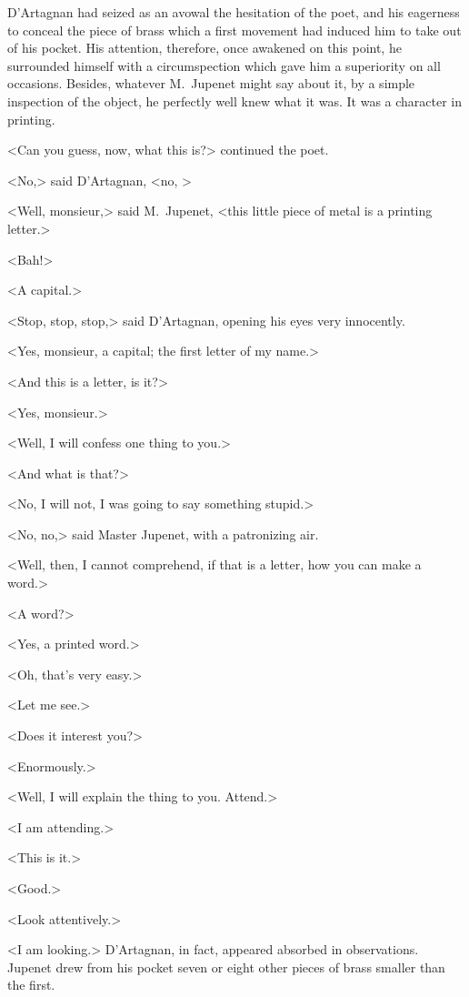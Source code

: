D'Artagnan had seized as an avowal the hesitation of the poet, and his eagerness to conceal the piece of brass which a first movement had induced him to take out of his pocket. His attention, therefore, once awakened on this point, he surrounded himself with a circumspection which gave him a superiority on all occasions. Besides, whatever M.~Jupenet might say about it, by a simple inspection of the object, he perfectly well knew what it was. It was a character in printing.

<Can you guess, now, what this is?> continued the poet.

<No,> said D'Artagnan, <no, >

<Well, monsieur,> said M.~Jupenet, <this little piece of metal is a printing letter.>

<Bah!>

<A capital.>

<Stop, stop, stop,> said D'Artagnan, opening his eyes very innocently.

<Yes, monsieur, a capital; the first letter of my name.>

<And this is a letter, is it?>

<Yes, monsieur.>

<Well, I will confess one thing to you.>

<And what is that?>

<No, I will not, I was going to say something stupid.>

<No, no,> said Master Jupenet, with a patronizing air.

<Well, then, I cannot comprehend, if that is a letter, how you can make a word.>

<A word?>

<Yes, a printed word.>

<Oh, that's very easy.>

<Let me see.>

<Does it interest you?>

<Enormously.>

<Well, I will explain the thing to you. Attend.>

<I am attending.>

<This is it.>

<Good.>

<Look attentively.>

<I am looking.> D'Artagnan, in fact, appeared absorbed in observations. Jupenet drew from his pocket seven or eight other pieces of brass smaller than the first.


